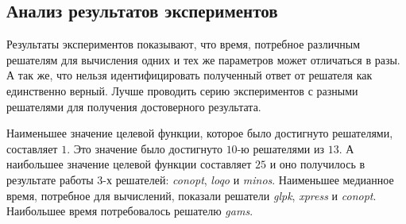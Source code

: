 \subsection*{Анализ результатов экспериментов}
Результаты экспериментов показывают, что время, потребное различным решателям для вычисления одних и тех же параметров может отличаться в разы. А так же, что нельзя идентифицировать полученный ответ от решателя как единственно верный. Лучше проводить серию экспериментов с разными решателями для получения достоверного результата.

Наименьшее значение целевой функции, которое было достигнуто решателями, составляет $1$. Это значение было достигнуто $10$-ю решателями из $13$. А наибольшее значение целевой функции составляет $25$ и оно получилось в результате работы $3$-х решателей: \textit{conopt}, \textit{loqo} и \textit{minos}. Наименьшее медианное время, потребное для вычислений, показали решатели \textit{glpk}, \textit{xpress} и \textit{conopt}. Наибольшее время потребовалось решателю \textit{gams}.
